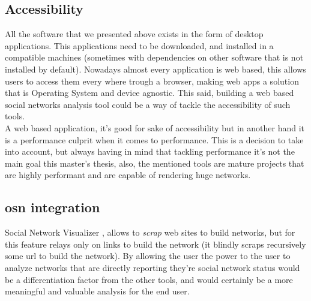 \subsection*{Accessibility}
All the software that we presented above exists in the form of desktop applications. This applications need to be downloaded, and installed in a compatible machines (sometimes with dependencies on other software that is not installed by default). Nowadays almost every application is web based, this allows users to access them every where trough a browser, making web apps a solution that is Operating System and device agnostic. This said, building a web based social networks analysis tool could be a way of tackle the accessibility of such tools.\\
\indent A web based application, it's good for sake of accessibility but in another hand it is a performance culprit when it comes to performance. This is a decision to take into account, but always having in mind that tackling performance it's not the main goal this master's thesis, also, the mentioned tools are mature projects that are highly performant and are capable of rendering huge networks.

\subsection*{\acrfull{osn} integration}
Social Network Visualizer \cite{socnetv}, allows to \textit{scrap} web sites to build networks, but for this feature relays only on links to build the network (it blindly scraps recursively some url to build the network). By allowing the user the power to the user to analyze networks that are directly reporting they're social network status would be a differentiation factor from the other tools, and would certainly be a more meaningful and valuable analysis for the end user.

